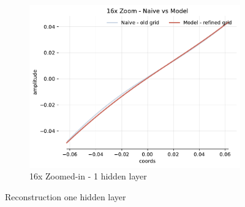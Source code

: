 \begin{figure}[!h]
\begin{subfigure}[b]{0.32\textwidth}
        \centering
        \includegraphics[width=\textwidth]{img/ch3/16x-6hf-1hl-1w-sub7.pdf}
        \caption{16x Zoomed-in - 1 hidden layer}
    \end{subfigure}
    \caption{Reconstruction one hidden layer}
    \label{f:rec-deep-multiple-filters}
\end{figure}
